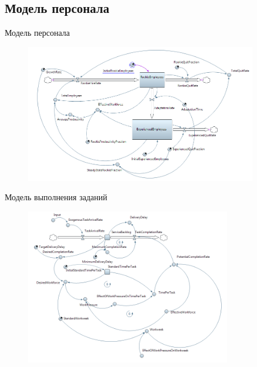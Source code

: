 \documentclass{beamer}
\begin{document}
\subsection{Модель персонала}
\begin{frame}{Модель персонала}
	\begin{figure}[ht]
		\centering
		\includegraphics[width=0.9\textwidth]{media/icmon1}
	\end{figure}  
\end{frame}

\begin{frame}{Модель выполнения заданий}
	\begin{figure}[ht]
		\centering
		\includegraphics[width=0.8\textwidth]{media/icmon2}
	\end{figure}  
\end{frame}
\end{document}
